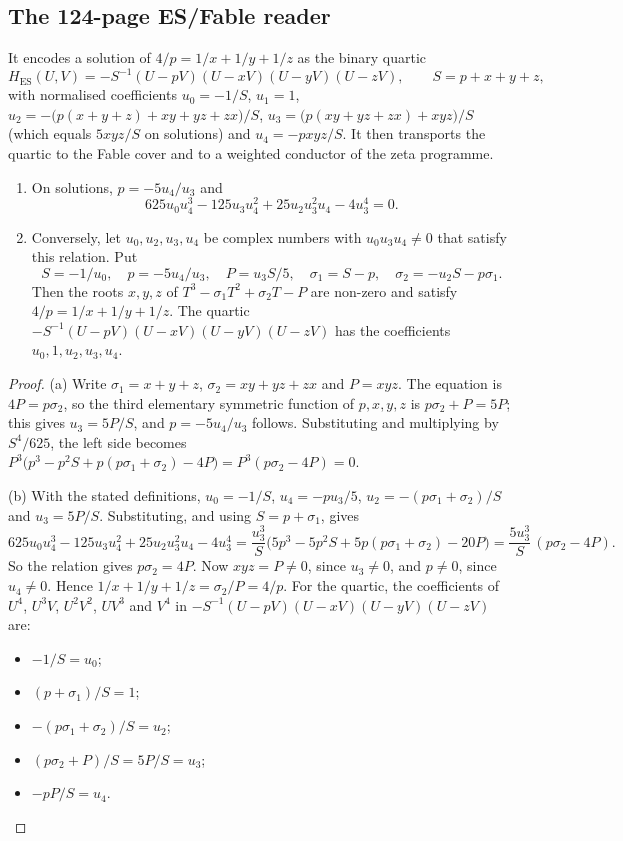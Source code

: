 \subsection{The 124-page ES/Fable reader}\label{ssec:crosswalk}

It encodes a solution of $4/p=1/x+1/y+1/z$ as the binary quartic
\[
H_{\mathrm{ES}}(U,V)=-S^{-1}(U-pV)(U-xV)(U-yV)(U-zV),\qquad S=p+x+y+z,
\]
with normalised coefficients $u_0=-1/S$, $u_1=1$, $u_2=-\bigl(p(x+y+z)+xy+yz+zx\bigr)/S$, $u_3=\bigl(p(xy+yz+zx)+xyz\bigr)/S$ (which equals $5xyz/S$ on solutions) and $u_4=-pxyz/S$. It then transports the quartic to the Fable cover and to a weighted conductor of the zeta programme.

\begin{proposition}\label{prop:quartic}
\begin{enumerate}[label=(\alph*)]
\item On solutions, $p=-5u_4/u_3$ and
\[
625u_0u_4^3-125u_3u_4^2+25u_2u_3^2u_4-4u_3^4=0 .
\]
\item Conversely, let $u_0,u_2,u_3,u_4$ be complex numbers with $u_0u_3u_4\ne0$ that satisfy this relation. Put
\[
S=-1/u_0,\quad p=-5u_4/u_3,\quad P=u_3S/5,\quad \sigma_1=S-p,\quad \sigma_2=-u_2S-p\sigma_1 .
\]
Then the roots $x,y,z$ of $T^3-\sigma_1T^2+\sigma_2T-P$ are non-zero and satisfy $4/p=1/x+1/y+1/z$. The quartic $-S^{-1}(U-pV)(U-xV)(U-yV)(U-zV)$ has the coefficients $u_0,1,u_2,u_3,u_4$.
\end{enumerate}
\end{proposition}
\begin{proof}
(a) Write $\sigma_1=x+y+z$, $\sigma_2=xy+yz+zx$ and $P=xyz$. The equation is $4P=p\sigma_2$, so the third elementary symmetric function of $p,x,y,z$ is $p\sigma_2+P=5P$; this gives $u_3=5P/S$, and $p=-5u_4/u_3$ follows. Substituting and multiplying by $S^4/625$, the left side becomes $P^3\bigl(p^3-p^2S+p(p\sigma_1+\sigma_2)-4P\bigr)=P^3(p\sigma_2-4P)=0$.

(b) With the stated definitions, $u_0=-1/S$, $u_4=-pu_3/5$, $u_2=-(p\sigma_1+\sigma_2)/S$ and $u_3=5P/S$. Substituting, and using $S=p+\sigma_1$, gives
\[
625u_0u_4^3-125u_3u_4^2+25u_2u_3^2u_4-4u_3^4=\frac{u_3^3}{S}\bigl(5p^3-5p^2S+5p(p\sigma_1+\sigma_2)-20P\bigr)=\frac{5u_3^3}{S}\,(p\sigma_2-4P).
\]
So the relation gives $p\sigma_2=4P$. Now $xyz=P\ne0$, since $u_3\ne0$, and $p\ne0$, since $u_4\ne0$. Hence $1/x+1/y+1/z=\sigma_2/P=4/p$.
For the quartic, the coefficients of $U^4$, $U^3V$, $U^2V^2$, $UV^3$ and $V^4$ in $-S^{-1}(U-pV)(U-xV)(U-yV)(U-zV)$ are:
\begin{itemize}
\item $-1/S=u_0$;
\item $(p+\sigma_1)/S=1$;
\item $-(p\sigma_1+\sigma_2)/S=u_2$;
\item $(p\sigma_2+P)/S=5P/S=u_3$;
\item $-pP/S=u_4$.
\end{itemize}
\end{proof}

